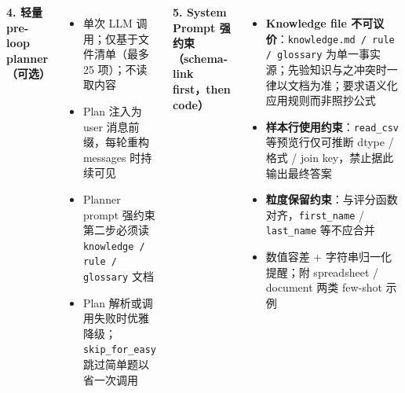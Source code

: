 \documentclass[11pt, aspectratio=169]{beamer}
\begin{document}
\begin{frame}[t]
\begin{columns}[T,onlytextwidth]

\textbf{4. 轻量 pre-loop planner（可选）}
\begin{itemize}
    \setlength\itemsep{0.05em}
    \item 单次 LLM 调用；仅基于文件清单（最多 25 项）；不读取内容
    \item Plan 注入为 user 消息前缀，每轮重构 messages 时持续可见
    \item Planner prompt 强约束第二步必须读 \texttt{knowledge / rule / glossary} 文档
    \item Plan 解析或调用失败时优雅降级；\texttt{skip\_for\_easy} 跳过简单题以省一次调用
\end{itemize}

\vspace{0.3em}

\textbf{5. System Prompt 强约束（schema-link first，then code）}
\begin{itemize}
    \setlength\itemsep{0.05em}
    \item \textbf{Knowledge file 不可议价}：\texttt{knowledge.md / rule / glossary} 为单一事实源；先验知识与之冲突时一律以文档为准；要求语义化应用规则而非照抄公式
    \item \textbf{样本行使用约束}：\texttt{read\_csv} 等预览行仅可推断 dtype / 格式 / join key，禁止据此输出最终答案
    \item \textbf{粒度保留约束}：与评分函数对齐，\texttt{first\_name} / \texttt{last\_name} 等不应合并
    \item 数值容差 + 字符串归一化提醒；附 spreadsheet / document 两类 few-shot 示例
\end{itemize}

\end{columns}
\end{frame}
\end{document}

